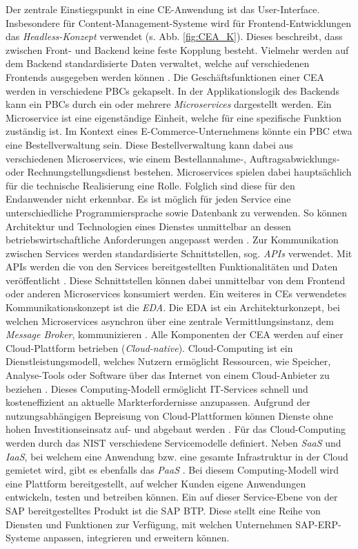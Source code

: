 Der zentrale Einstiegspunkt in eine CE-Anwendung ist das User-Interface. Insbesondere für Content-Management-Systeme wird für Frontend-Entwicklungen das \textit{Headless-Konzept} verwendet (s. Abb. \ref{fig:CEA_K}). Dieses beschreibt, dass zwischen Front- und Backend keine feste Kopplung besteht. Vielmehr werden auf dem Backend standardisierte Daten verwaltet, welche auf verschiedenen Frontends ausgegeben werden können \cite{.20230313}. Die Geschäftsfunktionen einer CEA werden in verschiedene PBCs gekapselt. In der Applikationslogik des Backends kann ein PBCs durch ein oder mehrere \textit{Microservices} dargestellt werden. Ein Microservice ist eine eigenständige Einheit, welche für eine spezifische Funktion zuständig ist. Im Kontext eines E-Commerce-Unternehmens könnte ein PBC etwa eine Bestellverwaltung sein. Diese Bestellverwaltung kann dabei aus verschiedenen Microservices, wie einem Bestellannahme-, Auftragsabwicklungs- oder Rechnungstellungsdienst bestehen. Microservices spielen dabei hauptsächlich für die technische Realisierung eine Rolle. Folglich sind diese für den Endanwender nicht erkennbar. Es ist möglich für jeden Service eine unterschiedliche Programmiersprache sowie Datenbank zu verwenden. So können Architektur und Technologien eines Dienstes unmittelbar an dessen betriebswirtschaftliche Anforderungen angepasst werden \cite[41]{.2009}. Zur Kommunikation zwischen Services werden standardisierte Schnittstellen, sog. \textit{\ac*{APIs}} verwendet. Mit APIs werden die von den Services bereitgestellten Funktionalitäten und Daten veröffentlicht \cite[15]{Biehl.2015}. Diese Schnittstellen können dabei unmittelbar von dem Frontend oder anderen Microservices konsumiert werden. Ein weiteres in CEs verwendetes Kommunikationskonzept ist die \textit{\ac{EDA}}. Die EDA ist ein Architekturkonzept, bei welchen Microservices asynchron über eine zentrale Vermittlungsinstanz, dem \textit{Message Broker}, kommunizieren \cite[54]{Bruns.2010}. Alle Komponenten der CEA werden auf einer Cloud-Plattform betrieben (\textit{Cloud-native}). Cloud-Computing ist ein Dienstleistungsmodell, welches Nutzern ermöglicht Ressourcen, wie Speicher, Analyse-Tools oder Software über das Internet von einem Cloud-Anbieter zu beziehen \cite[5]{Reinheimer.2018}. Dieses Computing-Modell ermöglicht IT-Services schnell und kosteneffizient an aktuelle Markterfordernisse anzupassen. Aufgrund der nutzungsabhängigen Bepreisung von Cloud-Plattformen können Dienste ohne hohen Investitionseinsatz auf- und abgebaut werden \cite[10]{Reinheimer.2018}. Für das Cloud-Computing werden durch das \ac{NIST} verschiedene Servicemodelle definiert. Neben \textit{\ac{SaaS}} und \textit{\ac{IaaS}}, bei welchem  eine Anwendung bzw. eine gesamte Infrastruktur in der Cloud gemietet wird, gibt es ebenfalls das \textit{\ac{PaaS}} \cite{Reinheimer.2018} \cite[9]{Reinheimer.2018}. Bei diesem Computing-Modell wird eine Plattform bereitgestellt, auf welcher Kunden eigene Anwendungen entwickeln, testen und betreiben können. Ein auf dieser Service-Ebene von der SAP bereitgestelltes Produkt ist die \ac{SAP BTP}. Diese stellt eine Reihe von Diensten und Funktionen zur Verfügung, mit welchen Unternehmen SAP-ERP-Systeme anpassen, integrieren und erweitern können. 

